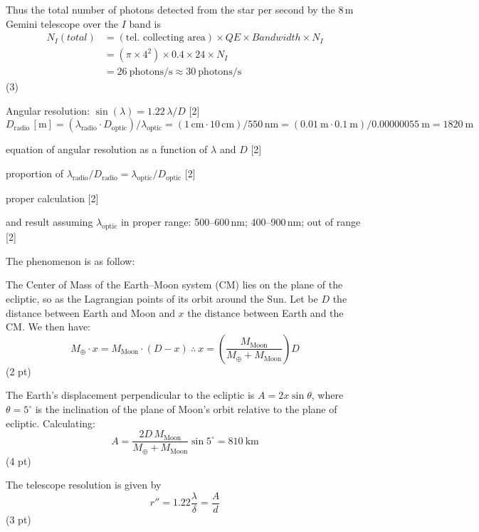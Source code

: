 Thus the total number of photons detected from the star per second by the 8\,m
Gemini telescope over the $I$ band is
\begin{align*}
N_I(total) &= (\text{tel.\ collecting area}) \times QE
  \times Bandwidth \times N_I\\
&= (\pi \times 4^2) \times 0.4 \times 24 \times N_I\\
&= 26\ \mathrm{photons/s} \approx 30\ \mathrm{photons/s}
\end{align*}
\hfill(3)

Angular resolution: $\sin(\lambda) = 1.22\,\lambda/D$
\hfill[2]
\[
D_{\mathrm{radio}}\,[\mathrm{m}]
 = (\lambda_{\mathrm{radio}} \cdot D_{\mathrm{optic}})/\lambda_{\mathrm{optic}}
 = (1\,\mathrm{cm} \cdot 10\,\mathrm{cm})/550\,\mathrm{nm}
 = (0.01\ \mathrm{m} \cdot 0.1\ \mathrm{m})/0.00000055\ \mathrm{m}
 = 1820\ \mathrm{m}
\]

equation of angular resolution as a function of $\lambda$ and $D$ \hfill[2]

proportion of
$\lambda_{\mathrm{radio}}/D_{\mathrm{radio}}
 = \lambda_{\mathrm{optic}}/D_{\mathrm{optic}}$ \hfill[2]

proper calculation \hfill[2]

and result assuming $\lambda_{\mathrm{optic}}$ in proper range:
500--600\,nm; 400--900\,nm; out of range \hfill[2]

The phenomenon is as follow:

The Center of Mass of the Earth--Moon system (CM) lies on the plane of the
ecliptic, so as the Lagrangian points of its orbit around the Sun. Let be $D$
the distance between Earth and Moon and $x$ the distance between Earth and
the CM. We then have:
\[
M_\oplus \cdot x = M_{\mathrm{Moon}} \cdot (D - x)
\ \therefore\
x = \left(\frac{M_{\mathrm{Moon}}}{M_\oplus + M_{\mathrm{Moon}}}\right)D
\]
\hfill(2 pt)

The Earth's displacement perpendicular to the ecliptic is $A = 2x\sin\theta$,
where $\theta = 5^\circ$ is the inclination of the plane of Moon's orbit
relative to the plane of ecliptic. Calculating:
\[
A = \frac{2D\,M_{\mathrm{Moon}}}{M_\oplus + M_{\mathrm{Moon}}}\sin 5^\circ
 = 810\ \mathrm{km}
\]
\hfill(4 pt)

The telescope resolution is given by
\[
r'' = 1.22\frac{\lambda}{\delta} = \frac{A}{d}
\]
\hfill(3 pt)

